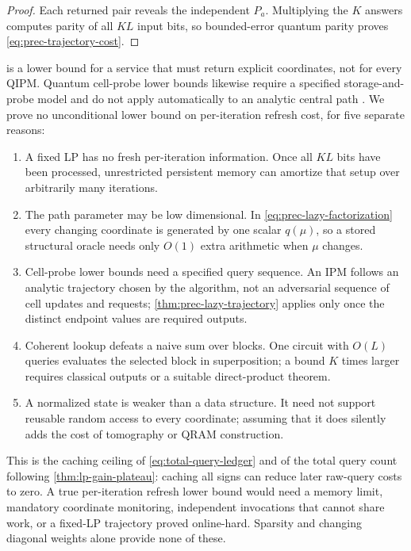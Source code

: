 \begin{proof}
Each returned pair reveals the independent $P_a$.  Multiplying the $K$
answers computes parity of all $KL$ input bits, so bounded-error quantum
parity proves \eqref{eq:prec-trajectory-cost}.
\end{proof}

 is a lower bound for a service that
must return explicit coordinates, not for every QIPM.  Quantum cell-probe
lower bounds likewise require a specified storage-and-probe model and do
not apply automatically to an analytic central path
\cite{sen2001-lower-bounds-quantum-cell-probe}.  We prove no unconditional
lower bound on per-iteration refresh cost, for five separate reasons:
\begin{enumerate}[leftmargin=*]
 \item A fixed LP has no fresh per-iteration information.  Once all $KL$
 bits have been processed, unrestricted persistent memory can amortize that
 setup over arbitrarily many iterations.
 \item The path parameter may be low dimensional.  In
 \eqref{eq:prec-lazy-factorization} every changing coordinate is generated by
 one scalar $q(\mu)$, so a stored structural oracle needs only $O(1)$ extra
 arithmetic when $\mu$ changes.
 \item Cell-probe lower bounds need a specified query sequence.  An IPM
 follows an analytic trajectory chosen by the algorithm, not an adversarial
 sequence of cell updates and requests; \cref{thm:prec-lazy-trajectory}
 applies only once the distinct endpoint values are required outputs.
 \item Coherent lookup defeats a naive sum over blocks.  One circuit with
 $O(L)$ queries evaluates the selected block in superposition; a bound
 $K$ times larger requires classical outputs or a suitable direct-product
 theorem.
 \item A normalized state is weaker than a data structure.  It need not
 support reusable random access to every coordinate; assuming that it does
 silently adds the cost of tomography or QRAM construction.
\end{enumerate}
This is the caching ceiling of \eqref{eq:total-query-ledger} and of the
total query count following \cref{thm:lp-gain-plateau}: caching all signs
can reduce later raw-query costs to zero.  A true per-iteration refresh lower
bound would need a memory limit, mandatory coordinate monitoring,
independent invocations that cannot share work, or a fixed-LP trajectory
proved online-hard.  Sparsity and changing diagonal weights alone provide
none of these.

